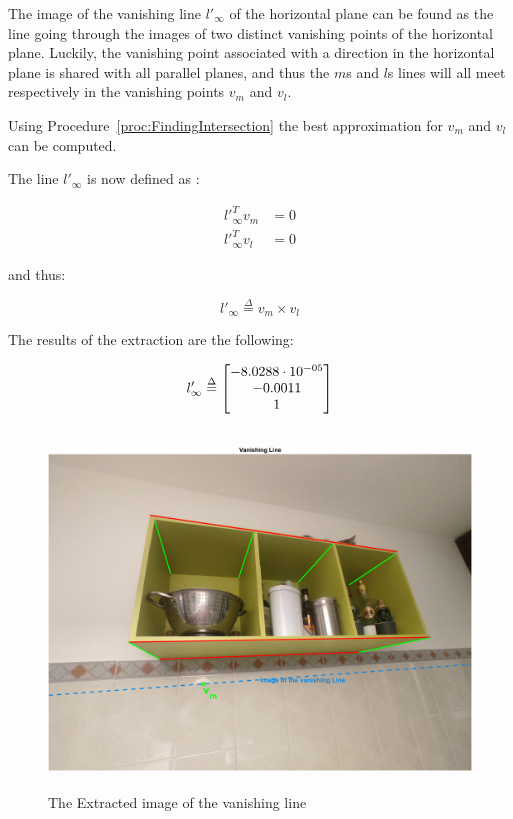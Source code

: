 The image of the vanishing line $l'_\infty$ of the horizontal plane can be found as the line going through the images of two distinct vanishing points of the horizontal plane. Luckily, the vanishing point associated with a direction in the horizontal plane is shared with all parallel planes, and thus the $m$s and $l$s lines will all meet respectively in the vanishing points $v_m$ and $v_l$. 

Using Procedure~\ref{proc:FindingIntersection} the best approximation for $v_m$ and $v_l$ can be computed.

The line $l'_\infty$ is now defined as :

\begin{equation*}
\begin{split}
l'_{\infty{}}^T v_m &= 0\\
l'_{\infty{}}^T v_l &= 0
\end{split}
\end{equation*}

and thus:

$$
l'_\infty{} \overset{\Delta}{=} v_m \times v_l
$$

The results of the extraction are the following:

$$
l'_\infty{} \overset{\Delta}{=}\colvec{-8.0288 \cdot 10^{-05}, -0.0011, 1}
$$

\begin{figure}[H]
\centering
\includegraphics[height=9.5cm, width=\textwidth, keepaspectratio]{Report/Images/2.1-VanishingLine/Vanishing Line.png}
\caption{\label{fig:Vanishing Line}The Extracted image of the vanishing line}
\end{figure}


